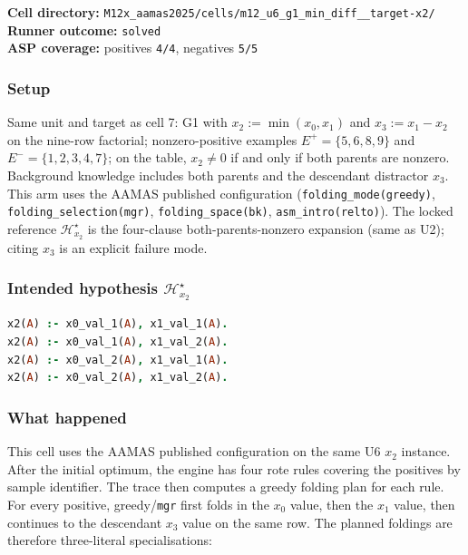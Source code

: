\documentclass[11pt]{article}
\begin{document}
\textbf{Cell directory:} \texttt{M12x\_aamas2025/cells/m12\_u6\_g1\_min\_diff\_\_target-x2/}\\
\textbf{Runner outcome:} \texttt{solved}\\
\textbf{ASP coverage:} positives \texttt{4/4}, negatives \texttt{5/5}

\subsubsection{Setup}

Same unit and target as cell 7: G1 with \(x_2:=\min(x_0,x_1)\) and \(x_3:=x_1-x_2\) on the nine-row factorial; nonzero-positive examples \(E^+=\{5,6,8,9\}\) and \(E^-=\{1,2,3,4,7\}\); on the table, \(x_2\neq 0\) if and only if both parents are nonzero. Background knowledge includes both parents and the descendant distractor \(x_3\). This arm uses the AAMAS published configuration (\texttt{folding\_mode(greedy)}, \texttt{folding\_selection(mgr)}, \texttt{folding\_space(bk)}, \texttt{asm\_intro(relto)}). The locked reference \(\mathcal{H}_{x_2}^\star\) is the four-clause both-parents-nonzero expansion (same as U2); citing \(x_3\) is an explicit failure mode.

\subsubsection{\texorpdfstring{Intended hypothesis \(\mathcal{H}_{x_2}^\star\)}{Intended hypothesis H-star(x2)}}

\begin{lstlisting}[style=logic,language=Prolog]
x2(A) :- x0_val_1(A), x1_val_1(A).
x2(A) :- x0_val_1(A), x1_val_2(A).
x2(A) :- x0_val_2(A), x1_val_1(A).
x2(A) :- x0_val_2(A), x1_val_2(A).
\end{lstlisting}

\subsubsection{What happened}

This cell uses the AAMAS published configuration on the same U6 \(x_2\) instance. After the initial optimum, the engine has four rote rules covering the positives by sample identifier. The trace then computes a greedy folding plan for each rule. For every positive, greedy/\texttt{mgr} first folds in the \(x_0\) value, then the \(x_1\) value, then continues to the descendant \(x_3\) value on the same row. The planned foldings are therefore three-literal specialisations:
\end{document}
